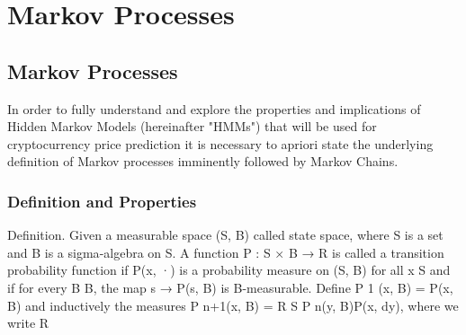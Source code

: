 

\chapter{Markov Processes}  %

\ifpdf
    \graphicspath{{Chapter1/Figs/Raster/}{Chapter1/Figs/PDF/}{Chapter1/Figs/}}
\else
    \graphicspath{{Chapter1/Figs/Vector/}{Chapter1/Figs/}}
\fi


\section{Markov Processes} %

In order to fully understand and explore the properties and implications of Hidden Markov Models (hereinafter "HMMs") that will be used for cryptocurrency price prediction it is necessary to apriori state the underlying definition of Markov processes imminently followed by Markov Chains. 

\subsection{Definition and Properties}

Definition. Given a measurable space (S, B) called state space, where S is
a set and B is a {sigma}-algebra on S. A function P : S × B → R is called a
transition probability function if P(x, ·) is a probability measure on (S, B)
for all x  S and if for every B  B, the map s → P(s, B) is B-measurable.
Define P
1
(x, B) = P(x, B) and inductively the measures P
n+1(x, B) =
R
S
P
n(y, B)P(x, dy), where we write R








\nomenclature[g-p]{$\pi$}{ $\simeq 3.14\ldots$}                                             %


